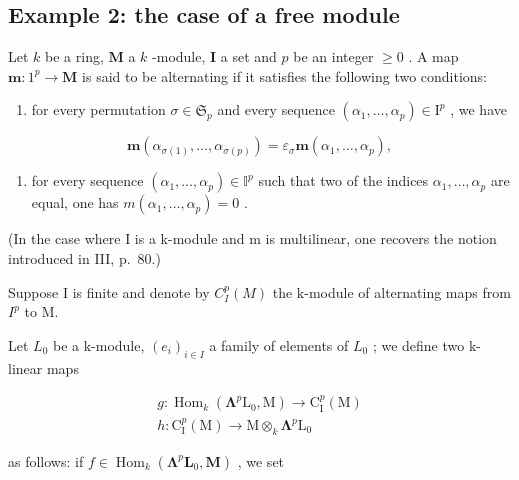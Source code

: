 \subsection{Example 2: the case of a free module}

Let \(k\) be a ring, \(\mathbf{M}\) a \(k\) -module, \(\mathbf{I}\) a set and \(p\) be an integer \(\geqslant 0\) . A map \(\boldsymbol{m}:1^{p}\to\mathbf{M}\) is said to be alternating if it satisfies the following two conditions:

\begin{enumerate}
\def\labelenumi{\alph{enumi})}
\tightlist
\item
  for every permutation \(\sigma \in \mathfrak{S}_p\) and every sequence \((\alpha_1, \ldots, \alpha_p) \in \mathrm{I}^p\) , we have
\end{enumerate}

\[
\boldsymbol {m} \left(\alpha_ {\sigma (1)}, \dots , \alpha_ {\sigma (p)}\right) = \varepsilon_ {\sigma} \boldsymbol {m} \left(\alpha_ {1}, \dots , \alpha_ {p}\right),
\]

\begin{enumerate}
\def\labelenumi{\alph{enumi})}
\setcounter{enumi}{1}
\tightlist
\item
  for every sequence \((\alpha_{1},\ldots,\alpha_{p})\in\mathbb{I}^{p}\) such that two of the indices \(\alpha_{1},\ldots,\alpha_{p}\) are equal, one has \(m(\alpha_{1},\ldots,\alpha_{p})=0\) .
\end{enumerate}

(In the case where I is a k-module and m is multilinear, one recovers the notion introduced in III, p.~80.)

Suppose I is finite and denote by \(C_{I}^{p}(M)\) the k-module of alternating maps from \(I^{p}\) to M.

Let \(L_{0}\) be a k-module, \((e_{i})_{i\in I}\) a family of elements of \(L_{0}\) ; we define two k-linear maps

\[
\begin{array}{l} g: \operatorname{Hom} _ {k} (\symbf {\Lambda} ^ {p} \mathrm{L} _ {0}, \mathrm{M}) \to \mathrm{C} _ {\mathrm{I}} ^ {p} (\mathrm{M}) \\ h: \mathrm{C} _ {\mathrm{I}} ^ {p} (\mathrm{M}) \to \mathrm{M} \otimes_ {k} \symbf {\Lambda} ^ {p} \mathrm{L} _ {0} \end{array}
\]

as follows: if \(f \in \operatorname{Hom}_k(\symbf{\Lambda}^p \mathbf{L}_0, \mathbf{M})\) , we set

